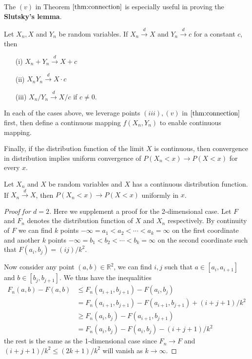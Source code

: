 \documentclass{article}
\begin{document}
The $(v)$ in Theorem $\ref{thm:connection}$ is especially useful in proving the \textbf{Slutsky's lemma}.
\begin{lemma}
    Let $X_n, X$ and $Y_n$ be random variables. If $X_n \xrightarrow{d} X$ and $Y_n \xrightarrow{d} c$ for a constant $c$, then
    \begin{enumerate}
        \item[(i)] $X_n + Y_n \xrightarrow{d} X + c$
        \item[(ii)] $X_n Y_n \xrightarrow{d} X \cdot c$
        \item[(iii)] $X_n / Y_n \xrightarrow{d} X / c$ if $c \neq 0$.
    \end{enumerate}
\end{lemma}
In each of the cases above, we leverage points $(iii), (v)$ in $\ref{thm:connection}$ first, then define a continuous mapping $f(X_n, Y_n)$ to enable continuous mapping.

Finally, if the distribution function of the limit $X$ is continuous, then convergence in distribution implies uniform convergence of $P(X_n < x) \to P(X < x)$ for every $x$.
\begin{lemma}
    Let $X_n$ and $X$ be random variables and $X$ has a continuous distribution function. If $X_n \xrightarrow{d} X$, then $P(X_n < x) \to P(X < x)$ uniformly in $x$.
\end{lemma}
\begin{proof}[Proof for $d = 2$]
    Here we supplement a proof for the 2-dimensional case. Let $F$ and $F_n$ denotes the distribution function of $X$ and $X_n$ respectively. By continuity of $F$ we can find $k$ points $-\infty = a_1 < a_2 < \cdots < a_{k} = \infty$ on the first coordinate and another $k$ points $-\infty = b_1 < b_2 < \cdots < b_{k} = \infty$ on the second coordinate such that $F(a_i, b_j) = (ij)/k^2$.

    Now consider any point $(a, b) \in \mathbb{R}^2$, we can find $i, j$ such that $a \in [a_i, a_{i+1}]$ and $b \in [b_j, b_{j+1}]$. We thus have the inequalities
    \begin{align*}
        F_n(a, b) - F(a, b) &\leq F_n(a_{i+1}, b_{j+1}) - F(a_i, b_j) \\ &= F_n(a_{i+1}, b_{j+1}) - F(a_{i+1}, b_{j+1}) + (i + j + 1)/k^2 
        \\ &\geq F_n(a_{i}, b_{j}) - F(a_{i+1}, b_{j+1})
        \\ &= F_n(a_{i}, b_{j}) - F(a_{i}, b_{j}) - (i + j + 1)/k^2
    \end{align*}
    the rest is the same as the 1-dimensional case since $F_n \to F$ and $(i + j + 1)/k^2 \leq (2k + 1)/k^2$ will vanish as $k \to \infty$.
\end{proof}
\end{document}
